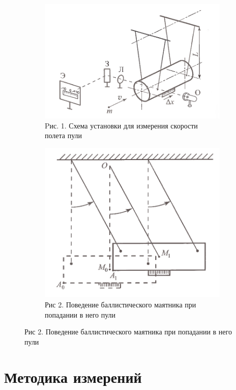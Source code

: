 \documentclass[a4paper, 12pt]{article}
\begin{document}
	
	\begin{figure}[h]
		
		\begin{subfigure}{0.5\textwidth}
			\includegraphics[width=0.9\linewidth]{1.png} 
			\caption{Pис. 1. Схема установки для измерения скорости полета пули}
			\label{fig:subim1}
		\end{subfigure}
		\begin{subfigure}{0.5\textwidth}
			\includegraphics[width=0.9\linewidth]{2.png}
			\caption{Рис 2. Поведение баллистического маятника при попадании в него пули}
			\label{fig:subim2}
		\end{subfigure}
		
	\end{figure}
	
	
	\section{Методика измерений}
	
\end{document}
